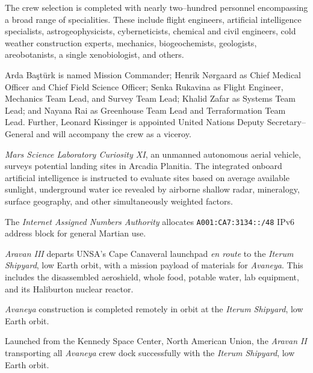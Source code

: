 The crew selection is completed with nearly two--hundred personnel encompassing a broad range of specialities. These include flight engineers, artificial intelligence specialists, astrogeophysicists, cyberneticists, chemical and civil engineers, cold weather construction experts, mechanics, biogeochemists, geologists, areobotanists, a single xenobiologist, and others.

Arda Baştürk is named Mission Commander; Henrik Nørgaard as Chief Medical Officer and Chief Field Science Officer; Senka Rukavina as Flight Engineer, Mechanics Team Lead, and Survey Team Lead; Khalid Zafar as Systems Team Lead; and Nayana Rai as Greenhouse Team Lead and Terraformation Team Lead. Further, Leonard Kissinger is appointed United Nations Deputy Secretary--General and will accompany the crew as a viceroy.
\StopTimelineDate

{\it Mars Science Laboratory Curiosity XI}, an unmanned autonomous aerial vehicle, surveys potential landing sites in Arcadia Planitia. The integrated onboard artificial intelligence is instructed to evaluate sites based on average available sunlight, underground water ice revealed by airborne shallow radar, mineralogy, surface geography, and other simultaneously weighted factors.
\StopTimelineDate

The {\it Internet Assigned Numbers Authority} allocates {\tt A001:CA7:3134::/48} IPv6 address block for general Martian use. 
\StopTimelineDate

{\it Aravan III} departs UNSA's Cape Canaveral launchpad {\it en route} to the {\it Iterum Shipyard}, low Earth orbit, with a mission payload of materials for {\it Avaneya}. This includes the disassembled aeroshield, whole food, potable water, lab equipment, and its Haliburton nuclear reactor.
\StopTimelineDate

{\it Avaneya} construction is completed remotely in orbit at the {\it Iterum Shipyard}, low Earth orbit.
\StopTimelineDate

Launched from the Kennedy Space Center, North American Union, the {\it Aravan II} transporting all {\it Avaneya} crew dock successfully with the {\it Iterum Shipyard}, low Earth orbit.
\StopTimelineDate

